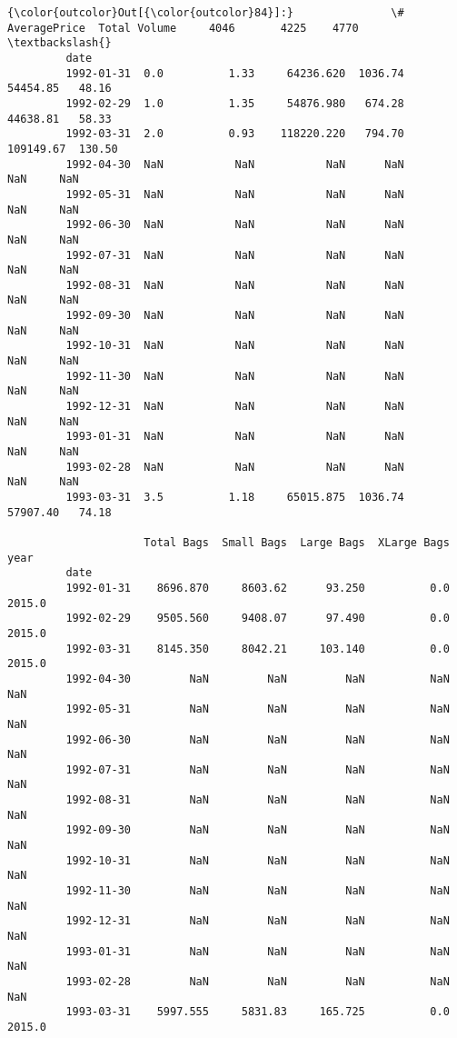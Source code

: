 \documentclass[11pt]{article}
\begin{document}
\begin{Verbatim}[commandchars=\\\{\}]
{\color{outcolor}Out[{\color{outcolor}84}]:}               \#  AveragePrice  Total Volume     4046       4225    4770  \textbackslash{}
         date                                                                      
         1992-01-31  0.0          1.33     64236.620  1036.74   54454.85   48.16   
         1992-02-29  1.0          1.35     54876.980   674.28   44638.81   58.33   
         1992-03-31  2.0          0.93    118220.220   794.70  109149.67  130.50   
         1992-04-30  NaN           NaN           NaN      NaN        NaN     NaN   
         1992-05-31  NaN           NaN           NaN      NaN        NaN     NaN   
         1992-06-30  NaN           NaN           NaN      NaN        NaN     NaN   
         1992-07-31  NaN           NaN           NaN      NaN        NaN     NaN   
         1992-08-31  NaN           NaN           NaN      NaN        NaN     NaN   
         1992-09-30  NaN           NaN           NaN      NaN        NaN     NaN   
         1992-10-31  NaN           NaN           NaN      NaN        NaN     NaN   
         1992-11-30  NaN           NaN           NaN      NaN        NaN     NaN   
         1992-12-31  NaN           NaN           NaN      NaN        NaN     NaN   
         1993-01-31  NaN           NaN           NaN      NaN        NaN     NaN   
         1993-02-28  NaN           NaN           NaN      NaN        NaN     NaN   
         1993-03-31  3.5          1.18     65015.875  1036.74   57907.40   74.18   
         
                     Total Bags  Small Bags  Large Bags  XLarge Bags    year  
         date                                                                 
         1992-01-31    8696.870     8603.62      93.250          0.0  2015.0  
         1992-02-29    9505.560     9408.07      97.490          0.0  2015.0  
         1992-03-31    8145.350     8042.21     103.140          0.0  2015.0  
         1992-04-30         NaN         NaN         NaN          NaN     NaN  
         1992-05-31         NaN         NaN         NaN          NaN     NaN  
         1992-06-30         NaN         NaN         NaN          NaN     NaN  
         1992-07-31         NaN         NaN         NaN          NaN     NaN  
         1992-08-31         NaN         NaN         NaN          NaN     NaN  
         1992-09-30         NaN         NaN         NaN          NaN     NaN  
         1992-10-31         NaN         NaN         NaN          NaN     NaN  
         1992-11-30         NaN         NaN         NaN          NaN     NaN  
         1992-12-31         NaN         NaN         NaN          NaN     NaN  
         1993-01-31         NaN         NaN         NaN          NaN     NaN  
         1993-02-28         NaN         NaN         NaN          NaN     NaN  
         1993-03-31    5997.555     5831.83     165.725          0.0  2015.0  
\end{Verbatim}
            
\end{document}
